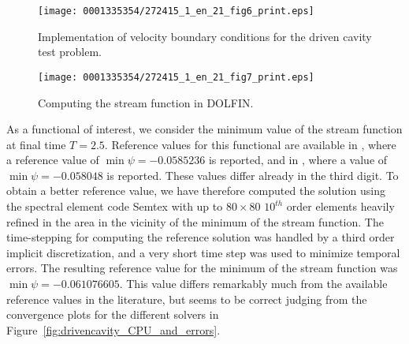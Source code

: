\begin{figure}[!t]
\centering
\texttt{[image: 0001335354/272415\_1\_en\_21\_fig6\_print.eps]}
\caption{Implementation of velocity boundary conditions for the
driven cavity test problem.}\label{fig:bc_drivencavity}\vspace*{6pt}
\end{figure}


\begin{figure}[!t]
\centering
\texttt{[image: 0001335354/272415\_1\_en\_21\_fig7\_print.eps]}
    \caption{Computing the stream function in DOLFIN.}
    \label{fig:streamfunction}
\end{figure}

As a functional of interest, we consider the minimum value of the
stream function at final time $T = 2.5$. Reference values for this
functional are available in \citet{PanditKalitaDalal2007}, where a
reference value of $\min\psi = -0.0585236$ is reported, and
in \citet{ChudanovPopkovChurbanovEtAl2007}, where a value of \hbox{$\min\psi
= -0.058048$} is reported. These values differ already in the third
digit. To obtain a better reference value, we have therefore
computed the solution using the spectral element code Semtex \citep{Blackburn2009,Blackburn2004}
with up to $80 \times 80$ $10^{th}$ order elements heavily refined in
the area in the vicinity of the minimum of the stream function. The
time-stepping for computing the reference solution was handled by a
third order implicit discretization, and a very short time step was used
to minimize temporal errors. The resulting reference value for the
minimum of the stream function was $\min\psi =-0.061076605$. This
value differs remarkably much from the available reference values in
the literature, but seems to be correct judging from the convergence
plots for the different solvers in
Figure~\ref{fig:drivencavity_CPU_and_errors}.

